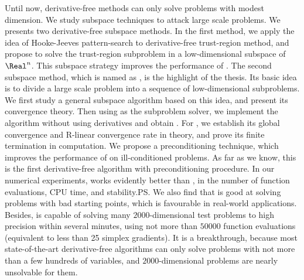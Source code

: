 \begin{englishabstract}
Until now, derivative-free methods can only solve problems with modest dimension.
We study subspace techniques to attack large scale problems. 
We presents two derivative-free subspace methods.
In the first method, we apply the idea of Hooke-Jeeves pattern-search to
derivative-free trust-region method, and propose to solve the trust-region
subproblem in a low-dimensional subspace of $\Real^n$.
This subspace strategy 
improves the performance of \newuoa\!\!. The second subspace method, which
is named as \newuoas\!\!, 
is the highlight of the thesis. Its basic idea is to
divide a large scale problem into a sequence of low-dimensional subproblems.
We first study a general subspace
algorithm based on this idea, and present its convergence theory.
Then using \newuoa as the subproblem solver,
we implement the algorithm without using derivatives and obtain \newuoas\!\!.
For \newuoas\!\!, we establish its global convergence and R-linear convergence rate
in theory, and prove its finite termination in computation. We propose a 
preconditioning technique, which improves the performance of \newuoas on
ill-conditioned problems. As far as we know, this is the first derivative-free
algorithm with preconditioning procedure. In our numerical experiments,
\newuoas works evidently better than \newuoa\!\!, in the number of function evaluations,
CPU time, and stability.\ps 
We also find that \newuoas is good at solving problems with bad starting points,
which is favourable in real-world applications. Besides, 
\newuoas is capable of solving many $2000$-dimensional test problems to high precision 
within several minutes, using not more than $50000$ function evaluations
(equivalent to less than 25 simplex gradients).
It is a breakthrough, because most state-of-the-art derivative-free algorithms
can only solve problems with not more than a few hundreds of variables,
and $2000$-dimensional problems are nearly unsolvable for them.

\end{englishabstract}
